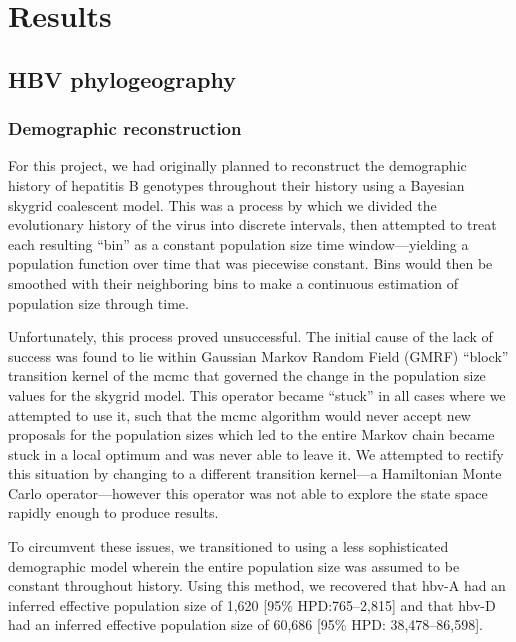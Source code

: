 \chapter{Results}\label{ch:results}

\section{HBV phylogeography}

\subsection{Demographic reconstruction}

For this project, we had originally planned to reconstruct the demographic history of hepatitis B genotypes throughout their history using a Bayesian skygrid coalescent model.
This was a process by which we divided the evolutionary history of the virus into discrete intervals, then attempted to treat each resulting ``bin'' as a constant population size time window---yielding a population function over time that was piecewise constant.
Bins would then be smoothed with their neighboring bins to make a continuous estimation of population size through time.

Unfortunately, this process proved unsuccessful.
The initial cause of the lack of success was found to lie within Gaussian Markov Random Field (GMRF) ``block'' transition kernel of the \gls{mcmc} that governed the change in the population size values for the skygrid model. %
This operator became ``stuck'' in all cases where we attempted to use it, such that the \gls{mcmc} algorithm would never accept new proposals for the population sizes which led to the entire Markov chain became stuck in a local optimum and was never able to leave it.
We attempted to rectify this situation by changing to a different transition kernel---a Hamiltonian Monte Carlo operator---however this operator was not able to explore the state space rapidly enough to produce results. %

To circumvent these issues, we transitioned to using a less sophisticated demographic model wherein the entire population size was assumed to be constant throughout history.
Using this method, we recovered that \gls{hbv}-A had an inferred effective population size of 1,620 [95\% HPD:765--2,815] and that \gls{hbv}-D had an inferred effective population size of 60,686 [95\% HPD: 38,478--86,598].

